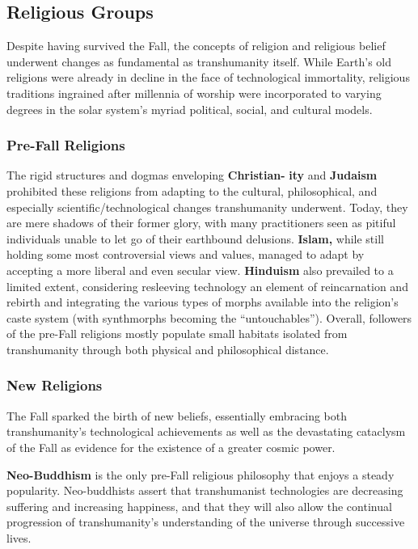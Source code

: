 \subsection{Religious Groups}

Despite having survived the Fall, the concepts of 
religion and religious belief underwent changes as 
fundamental as transhumanity itself. While Earth's old 
religions were already in decline in the face of technological immortality, religious traditions ingrained after 
millennia of worship were incorporated to varying 
degrees in the solar system's myriad political, social, 
and cultural models.

\subsubsection{Pre-Fall Religions}

The rigid structures and dogmas enveloping \textbf{Christian-}
\textbf{ity} and \textbf{Judaism} prohibited these religions from adapting to the cultural, philosophical, and especially scientific/technological changes transhumanity underwent. 
Today, they are mere shadows of their former glory, 
with many practitioners seen as pitiful individuals 
unable to let go of their earthbound delusions. \textbf{Islam,}
while still holding some most controversial views and 
values, managed to adapt by accepting a more liberal 
and even secular view. \textbf{Hinduism} also prevailed to a 
limited extent, considering resleeving technology an 
element of reincarnation and rebirth and integrating 
the various types of morphs available into the religion's caste system (with synthmorphs becoming the 
``untouchables''). Overall, followers of the pre-Fall 
religions mostly populate small habitats isolated from 
transhumanity through both physical and philosophical distance.

\subsubsection{New Religions}

The Fall sparked the birth of new beliefs, essentially embracing both transhumanity's technological 
achievements as well as the devastating cataclysm 
of the Fall as evidence for the existence of a greater 
cosmic power.

\textbf{Neo-Buddhism} is the only pre-Fall religious philosophy that enjoys a steady popularity. Neo-buddhists 
assert that transhumanist technologies are decreasing 
suffering and increasing happiness, and that they will 
also allow the continual progression of transhumanity's 
understanding of the universe through successive lives.

